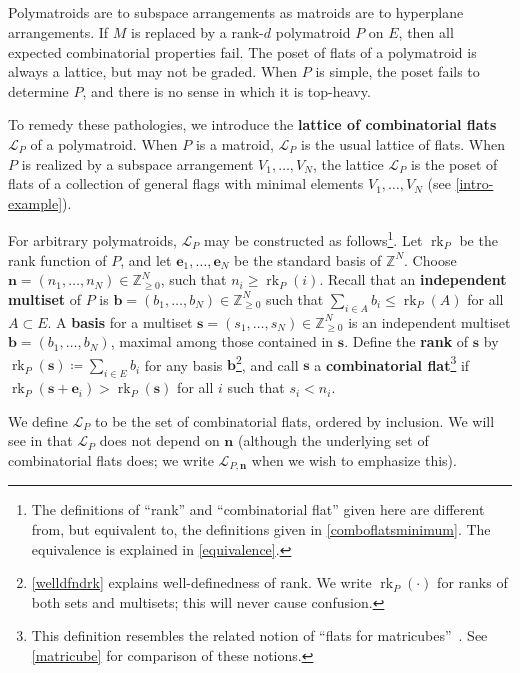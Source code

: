 \documentclass[11pt]{article}
\theoremstyle{definition}
\numberwithin{equation}{section}
\newcommand{\Z}{{\mathbb{Z}}}
\newcommand{\N}{\mathbb{Z}_{\geq 0}}
\DeclareMathOperator{\rk}{rk}
\newcommand{\word}[1]{\textbf{#1}}
\newcommand{\revision}[1]{{#1}}
\begin{document}
\subsection{} \label{intropolymatroid}
Polymatroids are to subspace arrangements as matroids are to hyperplane arrangements.
If $M$ is replaced by a rank-$d$ polymatroid $P$ on $E$, then all expected combinatorial properties fail.
The poset of flats of a polymatroid is always a lattice, but may not be graded.
When $P$ is simple, the poset fails to determine $P$, and there is no sense in which it is top-heavy.

\revision{To remedy these pathologies, we introduce the \word{lattice of combinatorial flats}~$\mathcal L_P$ of a polymatroid.
When $P$ is a matroid, $\mathcal L_P$ is the usual lattice of flats.
When $P$ is realized by a subspace arrangement $V_1, \ldots, V_N$, the lattice $\mathcal L_P$ is the poset of flats of a collection of general flags with minimal elements $V_1, \ldots, V_N$ (see \cref{intro-example}).

For arbitrary polymatroids,  $\mathcal L_P$ may be constructed as follows\footnote{The definitions of ``rank'' and ``combinatorial flat'' given here are different from, but equivalent to, the definitions given in \cref{comboflatsminimum}. The equivalence is explained in \cref{equivalence}.}.
Let $\rk_P$ be the rank function of $P$, and let $\mathbf e_1, \ldots, \mathbf e_N$ be the standard basis of $\Z^N$.
Choose $\mathbf n = (n_1,\ldots, n_N) \in \N^N$, such that $n_i \geq \rk_P(i)$.
Recall that an \word{independent multiset} of $P$ is $\mathbf b = (b_1, \ldots, b_N) \in \N^N$ such that $\sum_{i \in A} b_i \leq \rk_P(A)$ for all $A \subset E$.
A \word{basis} for a multiset $\mathbf s = (s_1, \ldots, s_N) \in \N^N$ is an independent multiset $\mathbf b = (b_1, \ldots, b_N)$, maximal among those contained in $\mathbf s$.
Define the \word{rank} of $\mathbf s$ by $\rk_P(\mathbf s) \coloneqq  \sum_{i \in E} b_i$ for any basis $\mathbf b$\footnote{\cref{welldfndrk} explains well-definedness of rank. We write $\rk_P(\cdot)$ for ranks of both sets and multisets; this will never cause confusion.}, and
call $\mathbf s$ a \word{combinatorial flat}\footnote{This definition resembles the related notion of ``flats for matricubes''~\cite{AG24}. See \cref{matricube} for comparison of these notions.}
if $\rk_P(\mathbf s + \mathbf e_i) > \rk_P(\mathbf s)$ for all $i$ such that $s_i < n_i$.

We define $\mathcal L_P$ to be the set of combinatorial flats, ordered by inclusion.
We will see in \Cref{comboflatsimplification} that $\mathcal L_P$ does not depend on $\mathbf n$ (although the underlying set of combinatorial flats does; we write $\mathcal L_{P, \mathbf n}$ when we wish to emphasize this).}
\end{document}
